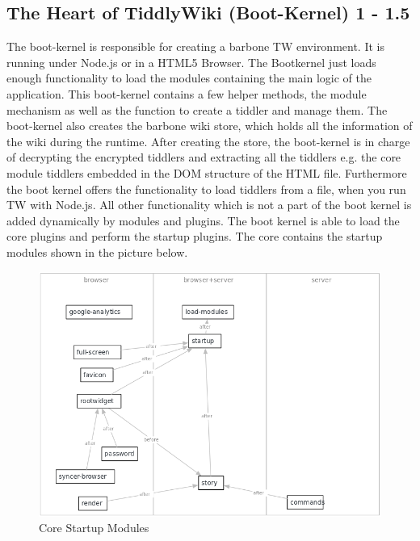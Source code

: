 \documentclass[12pt,a4paper]{scrartcl}
\begin{document}
\subsection{The Heart of TiddlyWiki (Boot-Kernel) 1 - 1.5}
The boot-kernel is responsible for creating a barbone TW environment. It is running under Node.js or in a HTML5 Browser. The Bootkernel just loads enough functionality to load the modules containing the main logic of the application. This boot-kernel contains a few helper methods, the module mechanism as well as the function to create a tiddler and manage them. The boot-kernel also creates the barbone wiki store, which holds all the information of the wiki during the runtime. After creating the store, the boot-kernel is in charge of decrypting the encrypted tiddlers and extracting all the tiddlers e.g. the core module tiddlers embedded in the DOM structure of the HTML file. Furthermore the boot kernel offers the functionality to load tiddlers from a file, when you run TW with Node.js. All other functionality which is not a part of the boot kernel is added dynamically by modules and plugins. The boot kernel is able to load the core plugins and perform the startup plugins. The core contains the startup modules shown in the picture below.
\begin{figure}[hbtp]
\caption{Core Startup Modules}
\includegraphics[scale=0.5]{images/index.png}
\end{figure}

\newpage
\end{document}

